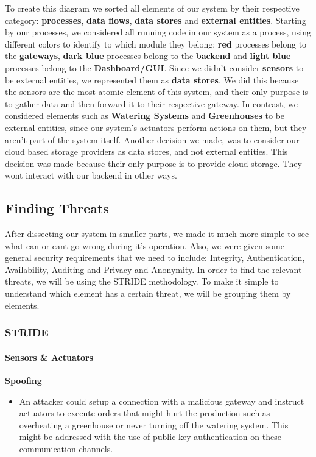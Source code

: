 To create this diagram we sorted all elements of our system by their respective category: \textbf{processes}, \textbf{data flows}, \textbf{data stores} and \textbf{external entities}. Starting by our processes, we considered all running code in our system as a process, using different colors to identify to which module they belong: \textbf{red} processes belong to the \textbf{gateways}, \textbf{dark blue} processes belong to the \textbf{backend} and \textbf{light blue} processes belong to the \textbf{Dashboard/GUI}. Since we didn't consider \textbf{sensors} to be external entities, we represented them as \textbf{data stores}. We did this because the sensors are the most atomic element of this system, and their only purpose is to gather data and then forward it to their respective gateway. In contrast, we considered elements such as \textbf{Watering Systems} and \textbf{Greenhouses} to be external entities, since our system's actuators perform actions on them, but they aren't part of the system itself. Another decision we made, was to consider our cloud based storage providers as data stores, and not external entities. This decision was made because their only purpose is to provide cloud storage. They wont interact with our backend in other ways.

\subsection{Finding Threats}

After dissecting our system in smaller parts, we made it much more simple to see what can or cant go wrong during it's operation. Also, we were given some general security requirements that we need to include: Integrity, Authentication, Availability, Auditing and Privacy and Anonymity. 
In order to find the relevant threats, we will be using the STRIDE methodology. To make it simple to understand which element has a certain threat, we will be grouping them by elements.

\subsubsection{STRIDE}

\paragraph{Sensors \& Actuators}\mbox{}

\textbf{Spoofing}

\begin{itemize}
    \item An attacker could setup a connection with a malicious gateway and instruct actuators to execute orders that might hurt the production such as overheating a greenhouse or never turning off the watering system. This might be addressed with the use of public key authentication on these communication channels.
\end{itemize}

